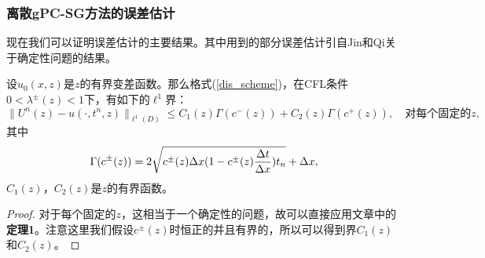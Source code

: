 \subsubsection{离散gPC-SG方法的误差估计}

现在我们可以证明误差估计的主要结果。其中用到的部分误差估计引自Jin和Qi关于确定性问题的结果。
\begin{lem}\label{lemma}
  设$u_0(x,z)$是$z$的有界变差函数。那么格式(\ref{dis_scheme})，在CFL条件$0 < \lambda^{\pm}(z) < 1$下，有如下的$\ell^1$界：
  \begin{equation}
    \|U^n(z) - u(\cdot,t^n,z)\|_{\ell^1(D)}\leq C_1(z)\Gamma(c^-(z)) + C_2(z)\Gamma(c^+(z)), \quad\text{对每个固定的$z$},
  \end{equation}
  其中
  \begin{equation}
  \Gamma(c^{\pm}(z)) = 2\sqrt{c^{\pm}(z)\Delta x(1-c^{\pm}(z)\frac{\Delta t}{\Delta x})t_n} + \Delta x,
  \end{equation}
  $C_1(z)$，$C_2(z)$是$z$的有界函数。
\end{lem}
\begin{proof}
  对于每个固定的$z$，这相当于一个确定性的问题，故可以直接应用文章中的{\bf 定理1}。注意这里我们假设$c^{\pm}(z)$时恒正的并且有界的，所以可以得到界$C_1(z)$和$C_2(z)$。
\end{proof}

